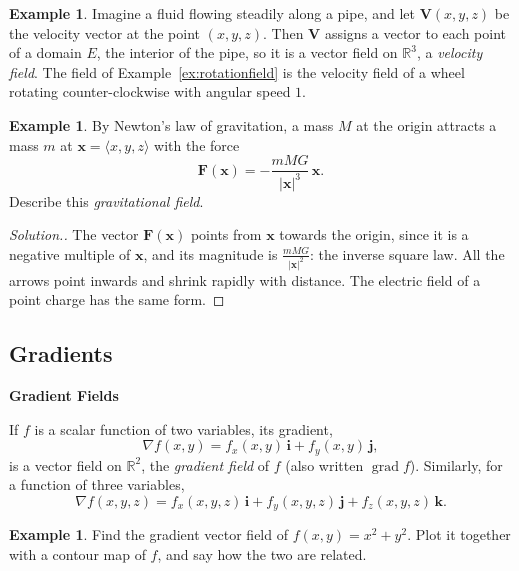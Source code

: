 \documentclass[11pt,a4paper]{article}
\DeclareMathOperator{\grad}{grad}
\theoremstyle{definition}
\newtheorem{exa}[thm]{Example}
\newenvironment{solution}
  {\renewcommand{\qedsymbol}{}\begin{proof}[\textit{Solution}.]}
  {\end{proof}}
\newcommand{\subhead}[1]{%
  \par\medskip\noindent\textbf{#1}\par\nobreak\smallskip}
\begin{document}
\begin{exa}
\label{ex:velocityfield}
Imagine a fluid flowing steadily along a pipe, and let $\mathbf V(x,y,z)$ be the
velocity vector at the point $(x,y,z)$. Then $\mathbf V$ assigns a vector to each
point of a domain $E$, the interior of the pipe, so it is a vector field on
$\mathbb{R}^3$, a \emph{velocity field}. The field of
Example~\ref{ex:rotationfield} is the velocity field of a wheel rotating
counter-clockwise with angular speed $1$.
\end{exa}

\begin{exa}
\label{ex:gravity}
By Newton's law of gravitation, a mass $M$ at the origin attracts a mass $m$ at
$\mathbf x = \langle x,y,z\rangle$ with the force
\[\mathbf F(\mathbf x) = -\frac{mMG}{|\mathbf x|^3}\,\mathbf x .\]
Describe this \emph{gravitational field}.
\end{exa}

\begin{solution}
The vector $\mathbf F(\mathbf x)$ points from $\mathbf x$ towards the origin,
since it is a negative multiple of $\mathbf x$, and its magnitude is
$\frac{mMG}{|\mathbf x|^2}$: the inverse square law. All the arrows point
inwards and shrink rapidly with distance. The electric field of a point charge
has the same form.
\end{solution}

{\color[wave]{485}\subsection{Gradients}}

\subhead{Gradient Fields}

If $f$ is a scalar function of two variables, its gradient,
\[\nabla f(x,y) = f_x(x,y)\,\mathbf i + f_y(x,y)\,\mathbf j ,\]
is a vector field on $\mathbb{R}^2$, the \emph{gradient field} of $f$ (also
written $\grad f$). Similarly, for a function of three variables,
\[\nabla f(x,y,z) = f_x(x,y,z)\,\mathbf i + f_y(x,y,z)\,\mathbf j +
f_z(x,y,z)\,\mathbf k .\]

\begin{exa}
\label{ex:gradfield}
Find the gradient vector field of $f(x,y) = x^2 + y^2$. Plot it together with a
contour map of $f$, and say how the two are related.
\end{exa}
\end{document}
